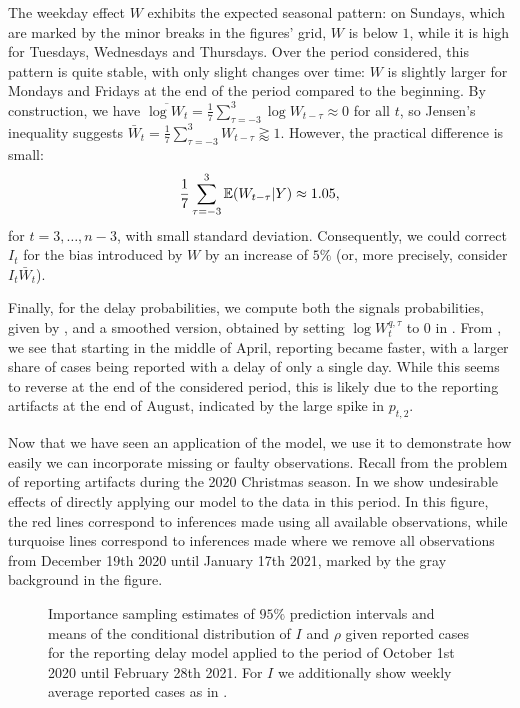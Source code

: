 The weekday effect $W$ exhibits the expected seasonal pattern: on Sundays, which are marked by the minor breaks in the figures' grid, $W$ is below $1$, while it is high for Tuesdays, Wednesdays and Thursdays. Over the period considered, this pattern is quite stable, with only slight changes over time: $W$ is slightly larger for Mondays and Fridays at the end of the period compared to the beginning. By construction, we have $\overline{\log W_{t}} = \frac{1}{7}\sum_{\tau = -3}^3 \log W_{t - \tau} \approx 0$ for all $t$, so Jensen's inequality suggests $\bar W_{t} = \frac{1}{7} \sum_{\tau = -3}^3 W_{t - \tau} \gtrapprox 1$. However, the practical difference is small: $$ \frac{1}{7} \sum_{\tau = -3}^3 \mathbb E (W_{t - \tau} | Y) \approx 1.05,$$ for $t = 3, \dots, n-3$, with small standard deviation. Consequently, we could correct $I_{t}$ for the bias introduced by $W$ by an increase of $5\%$ (or, more precisely, consider $ I_{t} \bar W_{t} $). 

Finally, for the delay probabilities, we compute both the signals probabilities, given by , and a smoothed version, obtained by setting $\log W_{t}^{q,\tau}$ to $0$ in . From , we see that starting in the middle of April, reporting became faster, with a larger share of cases being reported with a delay of only a single day. While this seems to reverse at the end of the considered period, this is likely due to the reporting artifacts at the end of August, indicated by the large spike in $p_{t,2}$. 

Now that we have seen an application of the model, we use it to demonstrate how easily we can incorporate missing or faulty observations. Recall from  the problem of reporting artifacts during the 2020 Christmas season. In  we show undesirable effects of directly applying our model to the data in this period. In this figure, the red lines correspond to inferences made using all available observations, while turquoise lines correspond to inferences made where we remove all observations from December 19th 2020 until January 17th 2021, marked by the gray background in the figure. 
\begin{figure}
    \resizebox{\textwidth}{!}{%
    }
    \caption{Importance sampling estimates of $95\%$ prediction intervals and means of the conditional distribution of $I$ and $\rho$ given reported cases for the reporting delay model applied to the period of October 1st 2020 until February 28th 2021. For $I$ we additionally show weekly average reported cases as in . }
    \label{fig:christmas_prediction_intervals_I_rho}
\end{figure}

